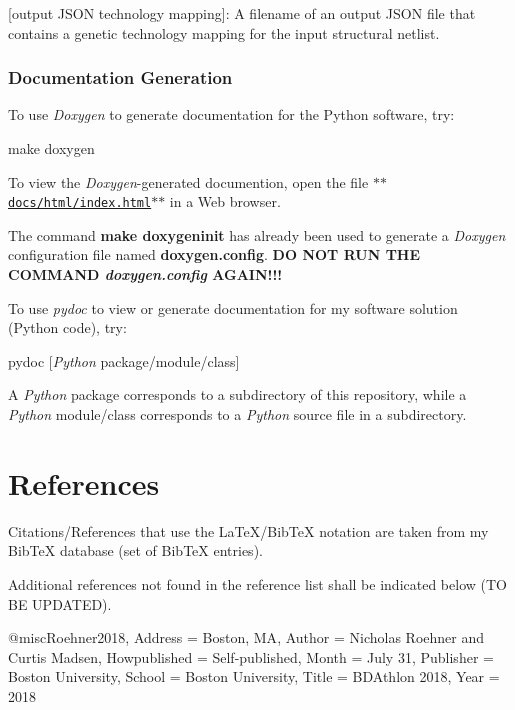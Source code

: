 \mbox{[}output J\+S\+O\+N technology mapping\mbox{]}\+: A filename of an output J\+S\+O\+N file that contains a genetic technology mapping for the input structural netlist.

\subsubsection*{Documentation Generation}

To use {\itshape Doxygen} to generate documentation for the Python software, try\+: \begin{DoxyVerb}make doxygen
\end{DoxyVerb}


To view the {\itshape Doxygen}-\/generated documention, open the file \href{https://github.com/BDAthlon/2018-wannabe-postdoc-1/blob/master/docs/html/index.html}{\tt $\ast$$\ast$docs/html/index.html$\ast$$\ast$} in a Web browser.

The command {\bfseries make doxygeninit} has already been used to generate a {\itshape Doxygen} configuration file named {\bfseries doxygen.\+config}. {\bfseries D\+O N\+O\+T R\+U\+N T\+H\+E C\+O\+M\+M\+A\+N\+D {\itshape doxygen.\+config} A\+G\+A\+I\+N!!!}

To use {\itshape pydoc} to view or generate documentation for my software solution (Python code), try\+:

pydoc \mbox{[}{\itshape Python} package/module/class\mbox{]}

A {\itshape Python} package corresponds to a subdirectory of this repository, while a {\itshape Python} module/class corresponds to a {\itshape Python} source file in a subdirectory.

\section*{References}

Citations/\+References that use the La\+Te\+X/\+Bib\+Te\+X notation are taken from my Bib\+Te\+X database (set of Bib\+Te\+X entries).

Additional references not found in the reference list shall be indicated below (T\+O B\+E U\+P\+D\+A\+T\+E\+D).

\begin{DoxyVerb}@misc{Roehner2018,
    Address = {Boston, {MA}},
    Author = {Nicholas Roehner and Curtis Madsen},
    Howpublished = {Self-published},
    Month = {July 31},
    Publisher = {Boston University},
    School = {Boston University},
    Title = {BDAthlon 2018},
    Year = {2018}}
\end{DoxyVerb}


